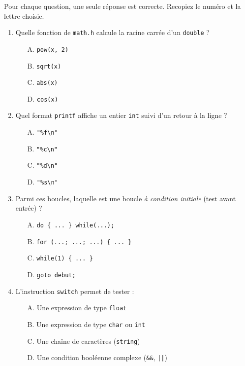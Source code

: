 \documentclass[11pt]{article}
\begin{document}
\begin{exercice}
Pour chaque question, une seule réponse est correcte. Recopiez le numéro et la lettre choisie.
\begin{enumerate}
    \item Quelle fonction de \texttt{math.h} calcule la racine carrée d'un \texttt{double} ?
    \begin{itemize}
        \item[A.] \texttt{pow(x, 2)}
        \item[B.] \texttt{sqrt(x)}
        \item[C.] \texttt{abs(x)}
        \item[D.] \texttt{cos(x)}
    \end{itemize}
    \item Quel format \texttt{printf} affiche un entier \texttt{int} suivi d'un retour à la ligne ?
    \begin{itemize}
        \item[A.] \texttt{"\%f\textbackslash n"}
        \item[B.] \texttt{"\%c\textbackslash n"}
        \item[C.] \texttt{"\%d\textbackslash n"}
        \item[D.] \texttt{"\%s\textbackslash n"}
    \end{itemize}
    \item Parmi ces boucles, laquelle est une boucle \emph{à condition initiale} (test avant entrée) ?
    \begin{itemize}
        \item[A.] \texttt{do \{ ... \} while(...);}
        \item[B.] \texttt{for (...; ...; ...) \{ ... \}}
        \item[C.] \texttt{while(1) \{ ... \}}
        \item[D.] \texttt{goto debut;}
    \end{itemize}
    \item L'instruction \texttt{switch} permet de tester :
    \begin{itemize}
        \item[A.] Une expression de type \texttt{float}
        \item[B.] Une expression de type \texttt{char} ou \texttt{int}
        \item[C.] Une chaîne de caractères (\texttt{string})
        \item[D.] Une condition booléenne complexe (\texttt{\&\&}, \texttt{||})
    \end{itemize}
\end{enumerate}
\end{exercice}
\end{document}

